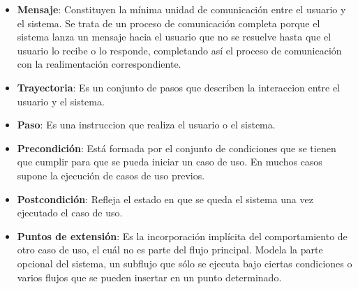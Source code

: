 \begin{itemize}
\item \textbf{Mensaje}: Constituyen la mínima unidad de comunicación entre el usuario y el sistema. Se trata de un proceso de comunicación completa porque el sistema lanza un mensaje hacia el usuario que no se resuelve hasta que el usuario lo recibe o lo responde, completando así el proceso de comunicación con la realimentación correspondiente.

\item \textbf{Trayectoria}: Es un conjunto de pasos que describen la interaccion entre el usuario y el sistema.

\item \textbf{Paso}: Es una instruccion que realiza el usuario o el sistema.

\item \textbf{Precondición}: Está formada por el conjunto de condiciones que se tienen que cumplir para que se pueda iniciar un caso de uso. En muchos casos supone la ejecución de casos de uso previos.

\item \textbf{Postcondición}: Refleja el estado en que se queda el sistema una vez ejecutado el caso de uso.

\item \textbf{Puntos de extensión}: Es la incorporación implícita del comportamiento de otro caso de uso, el cuál no es parte del flujo principal. Modela la parte opcional del sistema, un subflujo que sólo se ejecuta bajo ciertas condiciones o varios flujos que se pueden insertar en un punto determinado. 
\end{itemize}